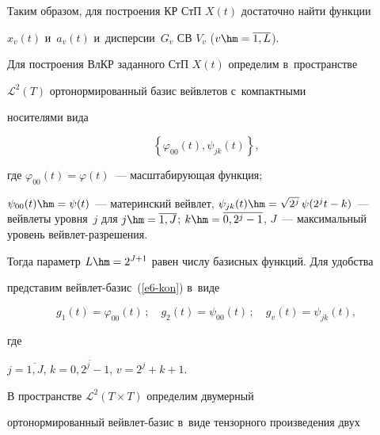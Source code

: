   


  Таким образом, для построения КР СтП $X(t)$ достаточно найти функции 


$x_v(t)$ и~$a_v(t)$ и~дисперсии~$G_v$ СВ $V_v$ ($v\hm= \overline{1,L}$).


  


  Для построения ВлКР заданного СтП $X(t)$ определим в~пространстве 


$\mathcal{L}^2(T)$ ортонормированный базис вейвлетов с~компактными 


носителями вида


  \begin{equation}


  \left\{ \varphi_{00}(t), \psi_{jk}(t)\right\},


  \label{e6-kon}


  \end{equation}


где $\varphi_{00}(t)= \varphi(t)$~--- масштабирующая функция; 


$\psi_{00}(t)\hm= \psi(t)$~--- материнский вейвлет, $\psi_{jk}(t)\hm= 


\sqrt{2^j}\,\psi(2^j t-k)$~--- вейвлеты уровня~$j$ для $j\hm= \overline{1, J}$; $k\hm= 


\overline{0,2^{j}-1}$, $J$~--- максимальный уровень вейв\-лет-раз\-ре\-ше\-ния. 


Тогда параметр $L\hm= 2^{J+1}$ равен числу базисных функций. Для удобства 


представим вейв\-лет-ба\-зис~(\ref{e6-kon}) в~виде


\begin{equation}


g_1(t)=\varphi_{00} (t)\,;\quad g_2(t)=\psi_{00}(t)\,;\quad


g_v(t)=\psi_{jk}(t),


\label{e7-kon}


\end{equation}


где


$ j=\overline{1, J}$, $k=\overline{0, 2^j-1}$, $v=2^j+k+1$.








  


  В пространстве $\mathcal{L}^2(T\times T)$ определим двумерный 


ортонормированный вейв\-лет-ба\-зис в~виде тензорного произведения двух 


